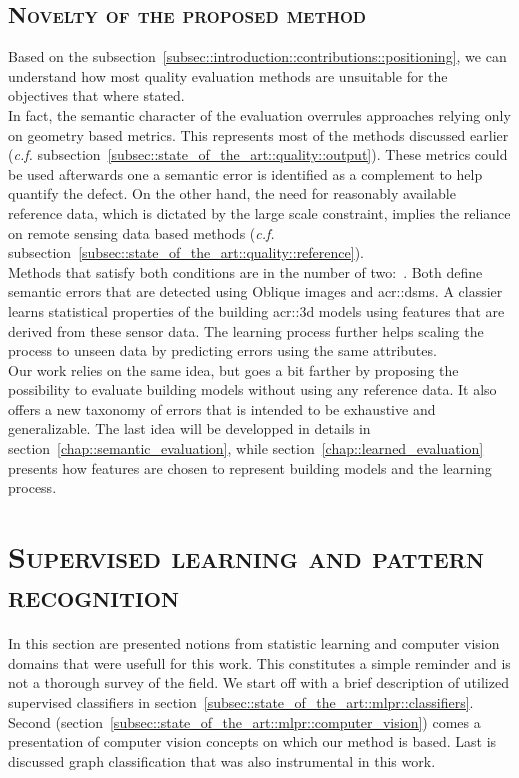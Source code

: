     \subsection{\textsc{Novelty of the proposed method}}
        \label{subsec::state_of_the_art::quality::novelty}
        Based on the subsection~\ref{subsec::introduction::contributions::positioning}, we can understand how most quality evaluation methods are unsuitable for the objectives that where stated.\\

        In fact, the semantic character of the evaluation overrules approaches relying only on geometry based metrics.
        This represents most of the methods discussed earlier (\textit{c.f.} subsection~\ref{subsec::state_of_the_art::quality::output}).
        These metrics could be used afterwards one a semantic error is identified as a complement to help quantify the defect.
        On the other hand, the need for reasonably available reference data, which is dictated by the large scale constraint, implies the reliance on remote sensing data based methods (\textit{c.f.} subsection~\ref{subsec::state_of_the_art::quality::reference}).\\

        Methods that satisfy both conditions are in the number of two:~\textcite{boudet2006supervised,michelin2013quality}.
        Both define semantic errors that are detected using Oblique images and \glspl{acr::dsm}.
        A classier learns statistical properties of the building \gls{acr::3d} models using features that are derived from these sensor data.
        The learning process further helps scaling the process to unseen data by predicting errors using the same attributes.\\

        Our work relies on the same idea, but goes a bit farther by proposing the possibility to evaluate building models without using any reference data.
        It also offers a new taxonomy of errors that is intended to be exhaustive and generalizable.
        The last idea will be developped in details in section~\ref{chap::semantic_evaluation}, while section~\ref{chap::learned_evaluation} presents how features are chosen to represent building models and the learning process.

\section{\textsc{Supervised learning and pattern recognition}}
    \label{sec::state_of_the_art::mlpr}
    In this section are presented notions from statistic learning and computer vision domains that were usefull for this work.
    This constitutes a simple reminder and is not a thorough survey of the field.
    We start off with a brief description of utilized supervised classifiers in section~\ref{subsec::state_of_the_art::mlpr::classifiers}.
    Second (section~\ref{subsec::state_of_the_art::mlpr::computer_vision}) comes a presentation of computer vision concepts on which our method is based.
    Last is discussed graph classification that was also instrumental in this work.

